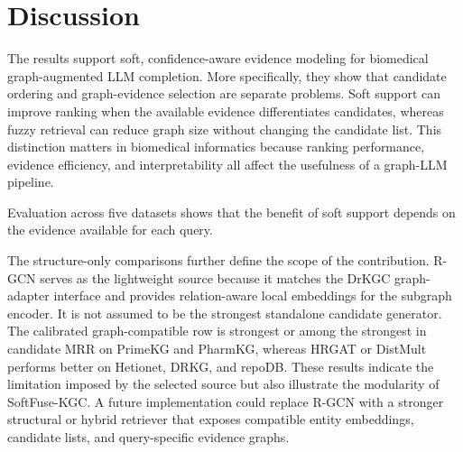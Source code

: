 \documentclass[pdflatex,sn-mathphys-num]{sn-jnl}
\newcommand{\softfuse}{SoftFuse-KGC}
\newcommand{\drkgc}{DrKGC}
\begin{document}
%


\section{Discussion}
\label{sec:discussion}

The results support soft, confidence-aware evidence modeling for biomedical graph-augmented LLM completion. More specifically, they show that candidate ordering and graph-evidence selection are separate problems. Soft support can improve ranking when the available evidence differentiates candidates, whereas fuzzy retrieval can reduce graph size without changing the candidate list. This distinction matters in biomedical informatics because ranking performance, evidence efficiency, and interpretability all affect the usefulness of a graph-LLM pipeline.


Evaluation across five datasets shows that the benefit of soft support depends on the evidence available for each query. 



The structure-only comparisons further define the scope of the contribution. R-GCN serves as the lightweight source because it matches the \drkgc{} graph-adapter interface and provides relation-aware local embeddings for the subgraph encoder. It is not assumed to be the strongest standalone candidate generator. The calibrated graph-compatible row is strongest or among the strongest in candidate MRR on PrimeKG and PharmKG, whereas HRGAT or DistMult performs better on Hetionet, DRKG, and repoDB. These results indicate the limitation imposed by the selected source but also illustrate the modularity of \softfuse{}. A future implementation could replace R-GCN with a stronger structural or hybrid retriever that exposes compatible entity embeddings, candidate lists, and query-specific evidence graphs.
\end{document}
